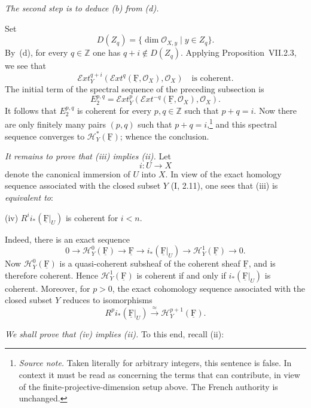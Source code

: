 \documentclass[10pt,a4paper]{article}
\newcommand{\uF}{\underline{\mathrm F}}
\newcommand{\cF}{\uF}
\newcommand{\cO}{\mathcal O}
\newcommand{\sExt}{\mathcal E\!xt}
\newcommand{\sH}{\mathcal H}
\newcommand{\markedfootnote}[2]{\begingroup\renewcommand{\thefootnote}{#1}\footnote{#2}\endgroup}
\theoremstyle{sgatheorem}
\theoremstyle{plain}
\numberwithin{equation}{section}
\newcounter{sourcecondition}
\begin{document}

\medskip
\noindent\textit{The second step is to deduce \textup{(b)} from
\textup{(d)}.}

\medskip
Set
\[
  D(Z_q)=\{\dim\cO_{X,y}\mid y\in Z_q\}.
\]
By~\textup{(d)}, for every $q\in\mathbb Z$ one has
$q+i\notin D(Z_q)$. Applying Proposition~VII.2.3, we see that
\[
  \sExt_Y^{q+i}(\sExt^q(\cF,\cO_X),\cO_X)
  \quad\text{is coherent.}
\]
The initial term of the spectral sequence of the preceding subsection is
\[
  E_2^{p,q}
  =\sExt_Y^p(\sExt^{-q}(\cF,\cO_X),\cO_X).
\]
It follows that $E_2^{p,q}$ is coherent for every $p,q\in\mathbb Z$ such
that $p+q=i$. Now there are only finitely many pairs $(p,q)$ such that
$p+q=i$,\markedfootnote{[S]}{\textit{Source note.} Taken literally for
arbitrary integers, this sentence is false. In context it must be read as
concerning the terms that can contribute, in view of the finite-projective-dimension
setup above. The French authority is unchanged.} and this spectral
sequence converges to $\sH_Y^\ast(\cF)$; whence the conclusion.


\medskip
\noindent\textit{It remains to prove that \textup{(iii)} implies
\textup{(ii)}.} Let
\[
  i\colon U\longrightarrow X
\]
denote the canonical immersion of $U$ into $X$. In view of the exact homology
sequence associated with the closed subset $Y$ (I, 2.11), one sees that
\textup{(iii)} is \textit{equivalent to}:

\medskip
\noindent\textup{(iv)} $R^i i_*(\cF|_U)$ is coherent for $i<n$.
\label{condition}

\medskip
{}\quad Indeed, there is
an exact sequence
\[
  0\longrightarrow \sH_Y^0(\cF)\longrightarrow \cF
  \longrightarrow i_*(\cF|_U)\longrightarrow \sH_Y^1(\cF)
  \longrightarrow 0.
\]
Now $\sH_Y^0(\cF)$ is a quasi-coherent subsheaf of the coherent sheaf $\cF$,
and is therefore coherent. Hence $\sH_Y^1(\cF)$ is coherent if and only if
$i_*(\cF|_U)$ is coherent. Moreover, for $p>0$, the exact cohomology sequence
associated with the closed subset $Y$ reduces to isomorphisms
\[
  R^p i_*(\cF|_U)\overset{\approx}{\longrightarrow}\sH_Y^{p+1}(\cF).
\]

\medskip
\noindent\textit{We shall prove that \textup{(iv)} implies
\textup{(ii)}.} To this end, recall \textup{(ii)}:
\end{document}
